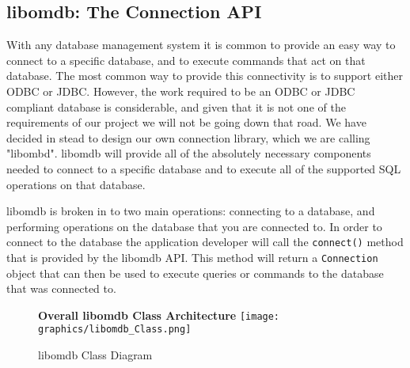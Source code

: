 \documentclass[letterpaper, 12pt]{article}
\begin{document}
  \subsection{libomdb: The Connection API}
  With any database management system it is common to provide an easy way to connect
  to a specific database, and to execute commands that act on that database. The most common
  way to provide this connectivity is to support either ODBC or JDBC. However, the work 
  required to be an ODBC or JDBC compliant database is considerable, and given that it is
  not one of the requirements of our project we will not be going down that road. We have
  decided in stead to design our own connection library, which we are calling 
  "libombd". libomdb will provide all of the absolutely necessary components needed to 
  connect to a specific database and to execute all of the supported SQL operations on
  that database. 
  \par\vspace{\baselineskip}
  libomdb is broken in to two main operations: connecting to a database, and performing
  operations on the database that you are connected to. In order to connect to the database
  the application developer will call the 
  \lstinline[basicstyle=\ttfamily]|connect()| method that is provided by the libomdb API. 
  This method will return a \lstinline[basicstyle=\ttfamily]|Connection| object that can
  then be used to execute queries or commands to the database that was connected to. 
  \par\vspace{\baselineskip}
  
  \begin{figure}
    \centering
    \textbf{Overall libomdb Class Architecture}
    \texttt{[image: graphics/libomdb\_Class.png]}
    \caption{libomdb Class Diagram}
  \end{figure}
  
\end{document}
